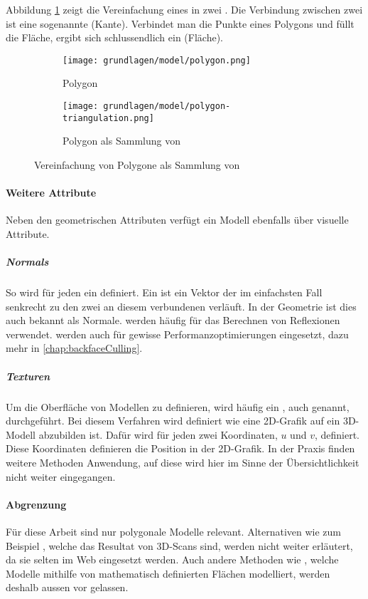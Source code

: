 Abbildung \ref{fig:modelSimpleTriangulation} zeigt die Vereinfachung eines  in zwei . Die Verbindung zwischen zwei  ist eine sogenannte  (Kante).
Verbindet man die Punkte eines Polygons und füllt die Fläche, ergibt sich schlussendlich ein  (Fläche).

\begin{figure}[H]
  \centering
  \begin{subfigure}{.5\textwidth}
    \centering
    \texttt{[image: grundlagen/model/polygon.png]}
    \caption{Polygon}
  \end{subfigure}%
  \begin{subfigure}{.5\textwidth}
    \centering
    \texttt{[image: grundlagen/model/polygon-triangulation.png]}
    \caption{Polygon als Sammlung von }
  \end{subfigure}
  \caption{Vereinfachung von Polygone als Sammlung von }
  \label{fig:modelSimpleTriangulation}
\end{figure}

\paragraph{Weitere Attribute}
Neben den geometrischen Attributen verfügt ein Modell ebenfalls über visuelle Attribute.

\subparagraph{Normals}

So wird für jeden  ein  definiert. Ein  ist ein Vektor der im einfachsten Fall senkrecht zu den zwei an diesem  verbundenen  verläuft. In der Geometrie ist dies auch bekannt als Normale.  werden häufig für das Berechnen von Reflexionen verwendet.
 werden auch für gewisse Performanzoptimierungen eingesetzt, dazu mehr in \autoref{chap:backfaceCulling}.

\subparagraph{Texturen}
Um die Oberfläche von Modellen zu definieren, wird häufig ein , auch  genannt, durchgeführt. Bei diesem Verfahren wird definiert wie eine 2D-Grafik auf ein 3D-Modell abzubilden ist. Dafür wird für jeden  zwei Koordinaten, $u$ und $v$, definiert. Diese Koordinaten definieren die Position in der 2D-Grafik. In der Praxis finden weitere Methoden Anwendung, auf diese wird hier im Sinne der Übersichtlichkeit nicht weiter eingegangen.

\paragraph{Abgrenzung}
Für diese Arbeit sind nur polygonale Modelle relevant.
Alternativen wie zum Beispiel , welche das Resultat von 3D-Scans sind, werden nicht weiter erläutert, da sie selten im Web eingesetzt werden. Auch andere Methoden wie , welche Modelle mithilfe von mathematisch definierten Flächen modelliert, werden deshalb aussen vor gelassen.

